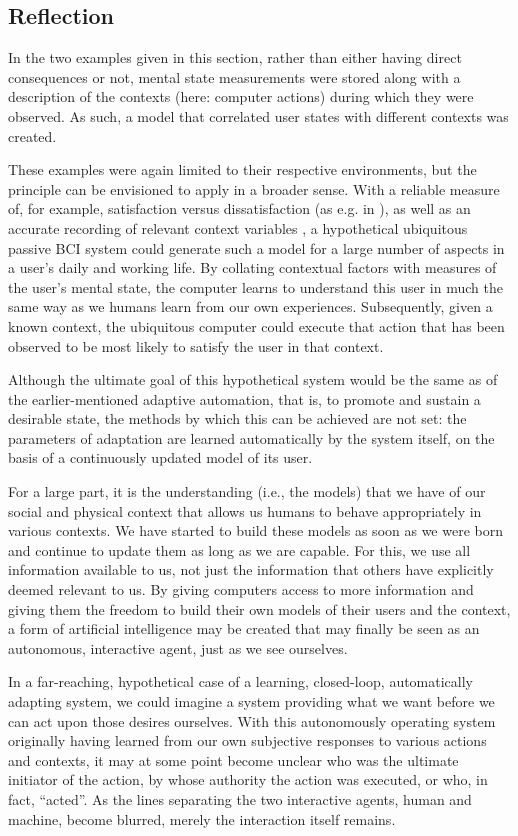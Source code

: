 \subsection{Reflection}

In the two examples given in this section, rather than either having direct consequences or not, mental state measurements were stored along with a description of the contexts (here: computer actions) during which they were observed. As such, a model that correlated user states with different contexts was created. 

These examples were again limited to their respective environments, but the principle can be envisioned to apply in a broader sense. With a reliable measure of, for example, satisfaction versus dissatisfaction (as e.g. in ), as well as an accurate recording of relevant context variables \cite{zander2012context}, a hypothetical ubiquitous passive BCI system could generate such a model for a large number of aspects in a user's daily and working life. By collating contextual factors with measures of the user's mental state, the computer learns to understand this user in much the same way as we humans learn from our own experiences. Subsequently, given a known context, the ubiquitous computer could execute that action that has been observed to be most likely to satisfy the user in that context. 

Although the ultimate goal of this hypothetical system would be the same as of the earlier-mentioned adaptive automation, that is, to promote and sustain a desirable state, the methods by which this can be achieved are not set: the parameters of adaptation are learned automatically by the system itself, on the basis of a continuously updated model of its user.

For a large part, it is the understanding (i.e., the models) that we have of our social and physical context that allows us humans to behave appropriately in various contexts. We have started to build these models as soon as we were born and continue to update them as long as we are capable. For this, we use all information available to us, not just the information that others have explicitly deemed relevant to us. By giving computers access to more information and giving them the freedom to build their own models of their users and the context, a form of artificial intelligence may be created that may finally be seen as an autonomous, interactive agent, just as we see ourselves.

In a far-reaching, hypothetical case of a learning, closed-loop, automatically adapting system, we could imagine a system providing what we want before we can act upon those desires ourselves. With this autonomously operating system originally having learned from our own subjective responses to various actions and contexts, it may at some point become unclear who was the ultimate initiator of the action, by whose authority the action was executed, or who, in fact, ``acted''.  As the lines separating the two interactive agents, human and machine, become blurred, merely the interaction itself remains. 

